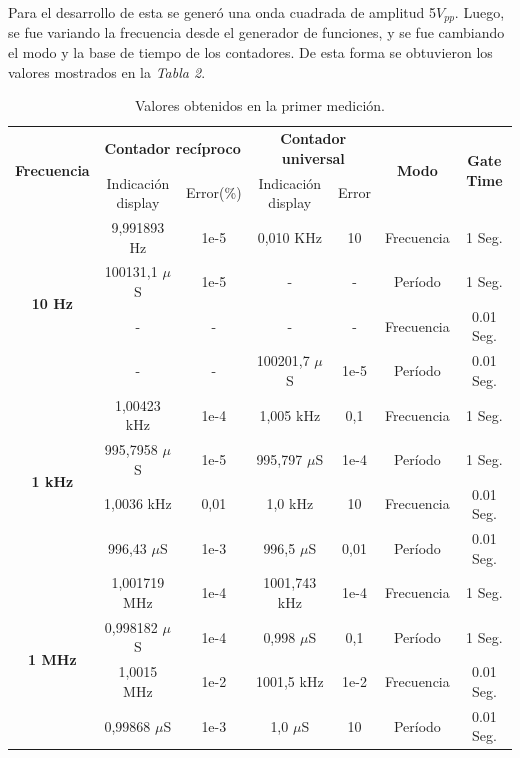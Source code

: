 \documentclass{article}
\begin{document}
	Para el desarrollo de esta se generó una onda cuadrada de amplitud 5$V_{pp}$. Luego, se fue variando la frecuencia desde el generador de funciones, y se fue cambiando el modo y la base de tiempo de los contadores. De esta forma se obtuvieron los valores mostrados en la \textit{Tabla 2}.
\bigskip\bigskip


\begin{table}[!hbt]
	\begin{center}

		\begin{tabular}{|c|c|c|c|c|c|c|} \hline
			\multirow{2}{*}{\textbf{Frecuencia}}
			& \multicolumn{2}{c|}{\textbf{Contador recíproco}} & \multicolumn{2}{c|}{\textbf{Contador universal}} & \multirow{2}{*}{\textbf{Modo}} & \multirow{2}{*}{\textbf{Gate Time}} \\\cline{2-5}
			& Indicación display & Error(\%) & Indicación display & Error & & \\\hline
			
			\multirow{4}{*}{\textbf{10 Hz}}
			& 9,991893 Hz & 1e-5  & 0,010 KHz & 10 & Frecuencia & 1 Seg. \\\cline{2-7}
			& 100131,1 $\mu$S & 1e-5 & - & - & Período & 1 Seg. \\\cline{2-7}
			& - & - & - & - & Frecuencia & 0.01 Seg. \\\cline{2-7}
			& - & - & 100201,7 $\mu$S & 1e-5  & Período & 0.01 Seg. \\\hline

			\multirow{4}{*}{\textbf{1 kHz}}
			& 1,00423 kHz & 1e-4  & 1,005 kHz & 0,1  & Frecuencia & 1 Seg. \\\cline{2-7}
			& 995,7958 $\mu$S & 1e-5 & 995,797 $\mu$S & 1e-4 & Período & 1 Seg. \\\cline{2-7}
			& 1,0036 kHz & 0,01 & 1,0 kHz & 10 & Frecuencia & 0.01 Seg. \\\cline{2-7}
			& 996,43 $\mu$S & 1e-3 & 996,5 $\mu$S & 0,01 & Período & 0.01 Seg. \\\hline

			\multirow{4}{*}{\textbf{1 MHz}}
			& 1,001719 MHz & 1e-4 & 1001,743 kHz & 1e-4 & Frecuencia & 1 Seg. \\\cline{2-7}
			& 0,998182 $\mu$S & 1e-4 & 0,998 $\mu$S & 0,1 & Período & 1 Seg. \\\cline{2-7}
			& 1,0015 MHz & 1e-2 & 1001,5 kHz & 1e-2 & Frecuencia & 0.01 Seg. \\\cline{2-7}
			& 0,99868 $\mu$S & 1e-3 & 1,0 $\mu$S & 10 & Período & 0.01 Seg. \\\hline
		\end{tabular}

	\caption{Valores obtenidos en la primer medición.}
	\end{center}
\end{table}
\medskip\medskip
\end{document}
